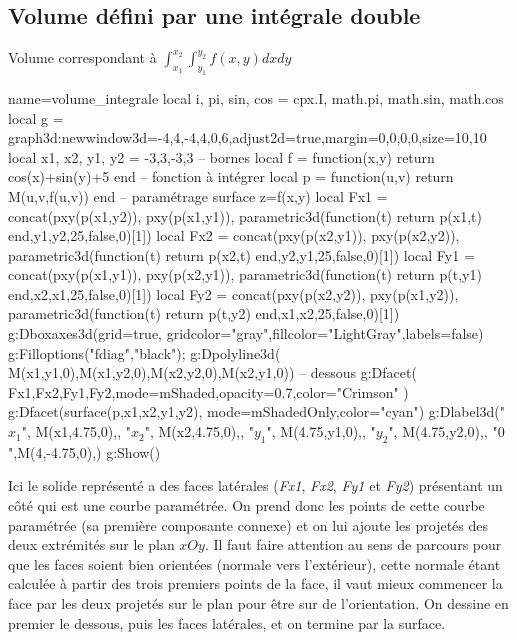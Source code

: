 \subsection{Volume défini par une intégrale double}
\begin{demo}{Volume correspondant à $\int_{x_1}^{x_2}\int_{y_1}^{y_2}f(x,y)dxdy$}
\begin{luadraw}{name=volume_integrale}
local i, pi, sin, cos = cpx.I, math.pi, math.sin, math.cos
local g = graph3d:new{window3d={-4,4,-4,4,0,6},adjust2d=true,margin={0,0,0,0},size={10,10}}
local x1, x2, y1, y2 = -3,3,-3,3 -- bornes
local f = function(x,y) return cos(x)+sin(y)+5 end -- fonction à intégrer
local p = function(u,v) return M(u,v,f(u,v)) end -- paramétrage surface z=f(x,y)
local Fx1 = concat({pxy(p(x1,y2)), pxy(p(x1,y1))}, parametric3d(function(t) return p(x1,t) end,y1,y2,25,false,0)[1])
local Fx2 = concat({pxy(p(x2,y1)), pxy(p(x2,y2))}, parametric3d(function(t) return p(x2,t) end,y2,y1,25,false,0)[1])
local Fy1 = concat({pxy(p(x1,y1)), pxy(p(x2,y1))}, parametric3d(function(t) return p(t,y1) end,x2,x1,25,false,0)[1])
local Fy2 = concat({pxy(p(x2,y2)), pxy(p(x1,y2))}, parametric3d(function(t) return p(t,y2) end,x1,x2,25,false,0)[1])
g:Dboxaxes3d({grid=true, gridcolor="gray",fillcolor="LightGray",labels=false})
g:Filloptions("fdiag","black"); g:Dpolyline3d( {M(x1,y1,0),M(x1,y2,0),M(x2,y2,0),M(x2,y1,0)}) -- dessous
g:Dfacet( {Fx1,Fx2,Fy1,Fy2},{mode=mShaded,opacity=0.7,color="Crimson"} )
g:Dfacet(surface(p,x1,x2,y1,y2), {mode=mShadedOnly,color="cyan"})
g:Dlabel3d("$x_1$", M(x1,4.75,0),{}, "$x_2$", M(x2,4.75,0),{}, "$y_1$", M(4.75,y1,0),{}, "$y_2$", M(4.75,y2,0),{}, "$0$",M(4,-4.75,0),{})  
g:Show()  
\end{luadraw}
\end{demo}

Ici le solide représenté a des faces latérales (\emph{Fx1}, \emph{Fx2}, \emph{Fy1} et \emph{Fy2}) présentant un côté qui est une courbe paramétrée. On prend donc les points de cette courbe paramétrée (sa première composante connexe) et on lui ajoute les projetés des deux extrémités sur le plan $xOy$. Il faut faire attention au sens de parcours pour que les faces soient bien orientées (normale vers l'extérieur), cette normale étant calculée à partir des trois premiers points de la face, il vaut mieux commencer la face par les deux projetés sur le plan pour être sur de l'orientation.
On dessine en premier le dessous, puis les faces latérales, et on termine par la surface.

